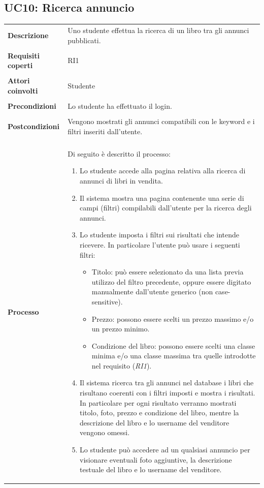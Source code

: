 \documentclass[10pt,a4paper]{report}
\begin{document}
	\subsection{UC10: Ricerca annuncio}
	\begin{tabular}{lp{}}
		\textbf{Descrizione}&Uno studente effettua la ricerca di un libro tra gli annunci pubblicati.\\
		\\
		\textbf{Requisiti coperti}&RI1\\
		\\
		\textbf{Attori coinvolti}&Studente\\
		\\
		\textbf{Precondizioni}&Lo studente ha effettuato il login.\\
		\\
		\textbf{Postcondizioni}&Vengono mostrati gli annunci compatibili con le keyword e i filtri inseriti dall'utente.\\
		\\
		\textbf{Processo}&Di seguito è descritto il processo:
		\begin{enumerate}
			\item Lo studente accede alla pagina relativa alla ricerca di annunci di libri in vendita.
			\item Il sistema mostra una pagina contenente una serie di campi (filtri) compilabili dall'utente per la ricerca degli annunci.
			\item Lo studente imposta i filtri sui risultati che intende ricevere. In particolare l'utente può usare i seguenti filtri:
			\begin{itemize}
				\item Titolo: può essere selezionato da una lista previa utilizzo del filtro precedente, oppure essere digitato manualmente dall'utente generico (non case-sensitive).
				\item Prezzo: possono essere scelti un prezzo massimo e/o un prezzo minimo.
				\item Condizione del libro: possono essere scelti una classe minima e/o una classe massima tra quelle introdotte nel requisito (\textit{RI1}).			
			\end{itemize}
			\item Il sistema ricerca tra gli annunci nel database i libri che risultano coerenti con i filtri imposti e mostra i risultati. In particolare per ogni risultato verranno mostrati titolo, foto, prezzo e condizione del libro, mentre la descrizione del libro e lo username del venditore vengono omessi.
			\item Lo studente può accedere ad un qualsiasi annuncio per visionare eventuali foto aggiuntive, la descrizione testuale del libro e lo username del venditore.
		\end{enumerate}
	\end{tabular}
	
\end{document}
